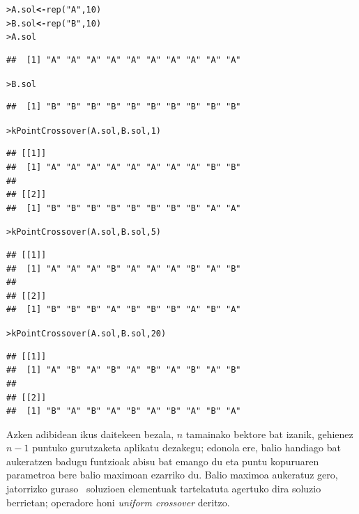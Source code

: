 \documentclass[eu]{ifirak}\usepackage[]{graphicx}\usepackage[]{color}
\makeatletter
\newcommand{\hlnum}[1]{\textcolor[rgb]{0.659,0.4,0.051}{#1}}%
\newcommand{\hlstr}[1]{\textcolor[rgb]{0.659,0.4,0.051}{#1}}%
\newcommand{\hlstd}[1]{\textcolor[rgb]{0,0,0}{#1}}%
\newcommand{\hlkwb}[1]{\textcolor[rgb]{0.549,0.114,0.412}{\textbf{#1}}}%
\newcommand{\hlkwd}[1]{\textcolor[rgb]{0.659,0.133,0.482}{#1}}%
\newenvironment{kframe}{%
 \def\at@end@of@kframe{}%
 \ifinner\ifhmode%
  \def\at@end@of@kframe{\end{minipage}}%
  \begin{minipage}{\columnwidth}%
 \fi\fi%
 \def\FrameCommand##1{\hskip\@totalleftmargin \hskip-\fboxsep
 \colorbox{shadecolor}{##1}\hskip-\fboxsep
     \hskip-\linewidth \hskip-\@totalleftmargin \hskip\columnwidth}%
 \MakeFramed {\advance\hsize-\width
   \@totalleftmargin\z@ \linewidth\hsize
   \@setminipage}}%
 {\par\unskip\endMakeFramed%
 \at@end@of@kframe}
\newenvironment{knitrout}{}{} %
\newcommand{\zkk}{\guillemotleft}
\newcommand{\skk}{\guillemotright}
\newcommand{\eng}[1]{\textit{#1}}
\newcommand{\hgl}[1]{\zkk #1\skk\ }
\makeatother
\begin{document}
\begin{knitrout}
\color{fgcolor}\begin{kframe}
\begin{alltt}
\hlstd{> }\hlstd{A.sol} \hlkwb{<-} \hlkwd{rep}\hlstd{(}\hlstr{"A"}\hlstd{,} \hlnum{10}\hlstd{)}
\hlstd{> }\hlstd{B.sol} \hlkwb{<-} \hlkwd{rep}\hlstd{(}\hlstr{"B"}\hlstd{,} \hlnum{10}\hlstd{)}
\hlstd{> }\hlstd{A.sol}
\end{alltt}
\begin{verbatim}
##  [1] "A" "A" "A" "A" "A" "A" "A" "A" "A" "A"
\end{verbatim}
\begin{alltt}
\hlstd{> }\hlstd{B.sol}
\end{alltt}
\begin{verbatim}
##  [1] "B" "B" "B" "B" "B" "B" "B" "B" "B" "B"
\end{verbatim}
\begin{alltt}
\hlstd{> }\hlkwd{kPointCrossover}\hlstd{(A.sol, B.sol,} \hlnum{1}\hlstd{)}
\end{alltt}
\begin{verbatim}
## [[1]]
##  [1] "A" "A" "A" "A" "A" "A" "A" "A" "B" "B"
## 
## [[2]]
##  [1] "B" "B" "B" "B" "B" "B" "B" "B" "A" "A"
\end{verbatim}
\begin{alltt}
\hlstd{> }\hlkwd{kPointCrossover}\hlstd{(A.sol, B.sol,} \hlnum{5}\hlstd{)}
\end{alltt}
\begin{verbatim}
## [[1]]
##  [1] "A" "A" "A" "B" "A" "A" "A" "B" "A" "B"
## 
## [[2]]
##  [1] "B" "B" "B" "A" "B" "B" "B" "A" "B" "A"
\end{verbatim}
\begin{alltt}
\hlstd{> }\hlkwd{kPointCrossover}\hlstd{(A.sol, B.sol,} \hlnum{20}\hlstd{)}
\end{alltt}


{\ttfamily\noindent\color{warningcolor}{\#\# Warning in kPointCrossover(A.sol, B.sol, 20): The length of the vectors is 10 so at most there can be 9 cut points. The parameter will be updated to this limit}}\begin{verbatim}
## [[1]]
##  [1] "A" "B" "A" "B" "A" "B" "A" "B" "A" "B"
## 
## [[2]]
##  [1] "B" "A" "B" "A" "B" "A" "B" "A" "B" "A"
\end{verbatim}
\end{kframe}
\end{knitrout}

Azken adibidean ikus daitekeen bezala, $n$ tamainako bektore bat izanik, gehienez $n-1$ puntuko gurutzaketa aplikatu dezakegu; edonola ere, balio handiago bat aukeratzen badugu funtzioak abisu bat emango du eta puntu kopuruaren parametroa bere balio maximoan ezarriko du. Balio maximoa aukeratuz gero, jatorrizko \hgl{guraso} soluzioen elementuak tartekatuta agertuko dira soluzio berrietan; operadore honi \eng{uniform crossover} deritzo.
\end{document}
